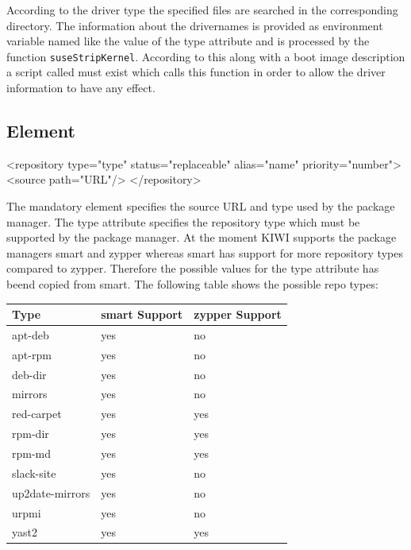 According to the driver type the specified files are searched in
the corresponding directory. The information about the drivernames
is provided as environment variable named like the value of
the type attribute and is processed by the function
\texttt{suseStripKernel}. According to this along with a boot image
description a script called  must exist which
calls this function in order to allow the driver information to
have any effect.


\subsection{ Element}
\begin{xml}
<repository type="type" status="replaceable"
            alias="name" priority="number">
  <source path="URL"/>
</repository>
\end{xml}

The mandatory  element specifies the source URL and
type used by the package manager. The type attribute specifies the
repository type which must be supported by the package manager.
At the moment KIWI supports the package managers smart and zypper
whereas smart has support for more repository types compared to
zypper. Therefore the possible values for the type attribute has
beend copied from smart. The following table shows the possible
repo types:\\ 

\begin{longtable}[h]{|p{4cm}|p{3cm}|p{3cm}|}
\hline
\textbf{Type} & \textbf{smart Support} & \textbf{zypper Support}\\
\hline 
apt-deb            & yes & no  \\
apt-rpm            & yes & no  \\
deb-dir            & yes & no  \\
mirrors            & yes & no  \\
red-carpet         & yes & yes \\
rpm-dir            & yes & yes \\
rpm-md             & yes & yes \\ 
slack-site         & yes & no  \\
up2date-mirrors    & yes & no  \\
urpmi              & yes & no  \\
yast2              & yes & yes \\
\hline
\end{longtable}


